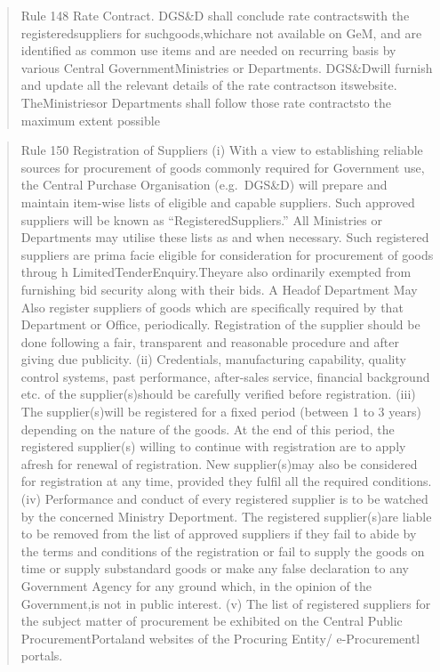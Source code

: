 \documentclass[
  11pt,
  twoside]{article}
\begin{document}
\begin{quote}
Rule 148 Rate Contract. DGS\&D shall conclude rate contractswith the
registeredsuppliers for suchgoods,whichare not available on GeM, and are
identified as common use items and are needed on recurring basis by
various Central GovernmentMinistries or Departments. DGS\&Dwill furnish
and update all the relevant details of the rate contractson itswebsite.
TheMinistriesor Departments shall follow those rate contractsto the
maximum extent possible
\end{quote}

\begin{quote}
Rule 150 Registration of Suppliers (i) With a view to establishing
reliable sources for procurement of goods commonly required for
Government use, the Central Purchase Organisation (e.g.~DGS\&D) will
prepare and maintain item-wise lists of eligible and capable suppliers.
Such approved suppliers will be known as ``RegisteredSuppliers.'' All
Ministries or Departments may utilise these lists as and when necessary.
Such registered suppliers are prima facie eligible for consideration for
procurement of goods throug h LimitedTenderEnquiry.Theyare also
ordinarily exempted from furnishing bid security along with their bids.
A Headof Department May Also register suppliers of goods which are
specifically required by that Department or Office, periodically.
Registration of the supplier should be done following a fair,
transparent and reasonable procedure and after giving due publicity.
(ii) Credentials, manufacturing capability, quality control systems,
past performance, after-sales service, financial background etc. of the
supplier(s)should be carefully verified before registration. (iii) The
supplier(s)will be registered for a fixed period (between 1 to 3 years)
depending on the nature of the goods. At the end of this period, the
registered supplier(s) willing to continue with registration are to
apply afresh for renewal of registration. New supplier(s)may also be
considered for registration at any time, provided they fulfil all the
required conditions. (iv) Performance and conduct of every registered
supplier is to be watched by the concerned Ministry Deportment. The
registered supplier(s)are liable to be removed from the list of approved
suppliers if they fail to abide by the terms and conditions of the
registration or fail to supply the goods on time or supply substandard
goods or make any false declaration to any Government Agency for any
ground which, in the opinion of the Government,is not in public
interest. (v) The list of registered suppliers for the subject matter of
procurement be exhibited on the Central Public ProcurementPortaland
websites of the Procuring Entity/ e-Procurementl portals.
\end{quote}
\end{document}
